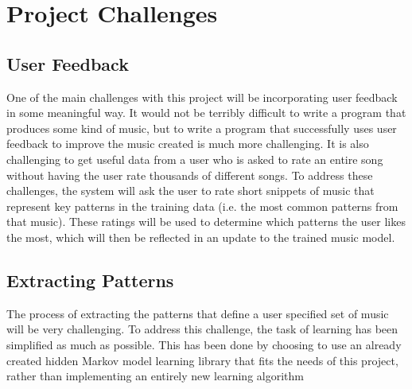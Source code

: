 \documentclass{article}
\begin{document}
\section{Project Challenges}
\subsection{User Feedback}
One of the main challenges with this project will be incorporating user feedback in some meaningful way. It would not be terribly difficult to write a program that produces some kind of music, but to write a program that successfully uses user feedback to improve the music created is much more challenging. It is also challenging to get useful data from a user who is asked to rate an entire song without having the user rate thousands of different songs. To address these challenges, the system will ask the user to rate short snippets of music that represent key patterns in the training data (i.e. the most common patterns from that music). These ratings will be used to determine which patterns the user likes the most, which will then be reflected in an update to the trained music model.

\subsection{Extracting Patterns}
The process of extracting the patterns that define a user specified set of music will be very challenging. To address this challenge, the task of learning has been simplified as much as possible. This has been done by choosing to use an already created hidden Markov model learning library that fits the needs of this project, rather than implementing an entirely new learning algorithm

\nocite{*}





\end{document}
